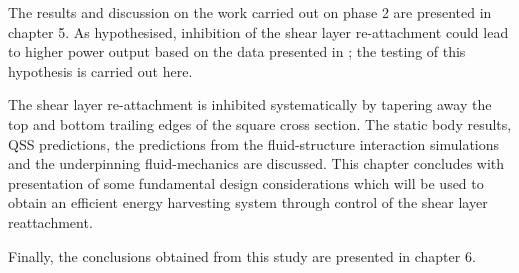 The results and discussion on the work carried out on phase 2 are presented in chapter 5. As hypothesised, inhibition of the shear layer re-attachment could lead to higher power output based on the data presented in \citet{Luo1994}; the testing of this hypothesis is carried out here. 

The shear layer re-attachment is inhibited systematically by tapering away the top and bottom trailing edges of the square cross section. The static body results, QSS predictions, the predictions from the fluid-structure interaction simulations and the underpinning fluid-mechanics are discussed. This chapter concludes with presentation of some fundamental design considerations which will be used to obtain an efficient energy harvesting system through control of the shear layer reattachment.

Finally, the conclusions obtained from this study are presented in chapter 6.









